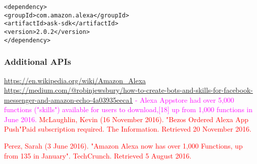 \begin{verbatim}
<dependency>
<groupId>com.amazon.alexa</groupId>
<artifactId>ask-sdk</artifactId>
<version>2.0.2</version>
</dependency>
\end{verbatim}




\subsubsection*{Additional APIs}














\url{https://en.wikipedia.org/wiki/Amazon_Alexa}
\url{https://medium.com/@robinjewsbury/how-to-create-bots-and-skills-for-facebook-messenger-and-amazon-echo-4a03935eeca1}
\textcolor{magenta}{
- Alexa Appstore had over 5,000 functions ("skills") available for users to download,[18] up from 1,000 functions in June 2016.
}
\textcolor{red}{McLaughlin, Kevin (16 November 2016). "Bezos Ordered Alexa App Push"Paid subscription required. The Information. Retrieved 20 November 2016.}

\textcolor{red}{Perez, Sarah (3 June 2016). "Amazon Alexa now has over 1,000 Functions, up from 135 in January". TechCrunch. Retrieved 5 August 2016.}





